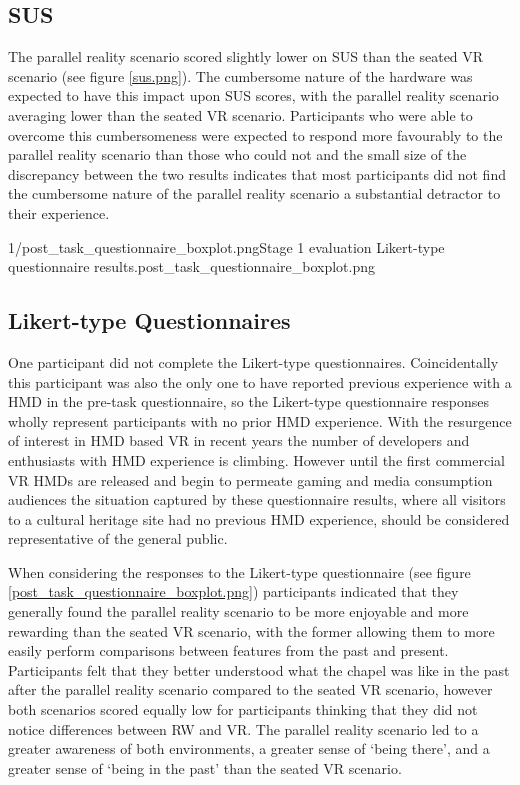 
\subsection{SUS}
The parallel reality scenario scored slightly lower on SUS than the seated VR scenario (see figure \ref{sus.png}). The cumbersome nature of the hardware was expected to have this impact upon SUS scores, with the parallel reality scenario averaging lower than the seated VR scenario. Participants who were able to overcome this cumbersomeness were expected to respond more favourably to the parallel reality scenario than those who could not and the small size of the discrepancy between the two results indicates that most participants did not find the cumbersome nature of the parallel reality scenario a substantial detractor to their experience.

       {1/post_task_questionnaire_boxplot.png}{Stage 1 evaluation Likert-type questionnaire results.}{post_task_questionnaire_boxplot.png}


\subsection{Likert-type Questionnaires}

One participant did not complete the Likert-type questionnaires. Coincidentally this participant was also the only one to have reported previous experience with a HMD in the pre-task questionnaire, so the Likert-type questionnaire responses wholly represent participants with no prior HMD experience. With the resurgence of interest in HMD based VR in recent years the number of developers and enthusiasts with HMD experience is climbing. However until the first commercial VR HMDs are released and begin to permeate gaming and media consumption audiences the situation captured by these questionnaire results, where all visitors to a cultural heritage site had no previous HMD experience, should be considered representative of the general public.

When considering the responses to the Likert-type questionnaire (see figure \ref{post_task_questionnaire_boxplot.png}) participants indicated that they generally found the parallel reality scenario to be more enjoyable and more rewarding than the seated VR scenario, with the former allowing them to more easily perform comparisons between features from the past and present. Participants felt that they better understood what the chapel was like in the past after the parallel reality scenario compared to the seated VR scenario, however both scenarios scored equally low for participants thinking that they did not notice differences between RW and VR. The parallel reality scenario led to a greater awareness of both environments, a greater sense of `being there', and a greater sense of `being in the past' than the seated VR scenario.


